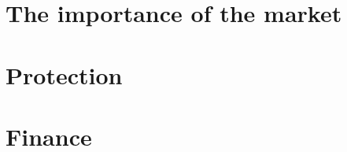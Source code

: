\documentclass[a4paper]{proc}
\begin{document}



  \section{The importance of the market}


  \section{Protection}



  \section{Finance}
\end{document}
